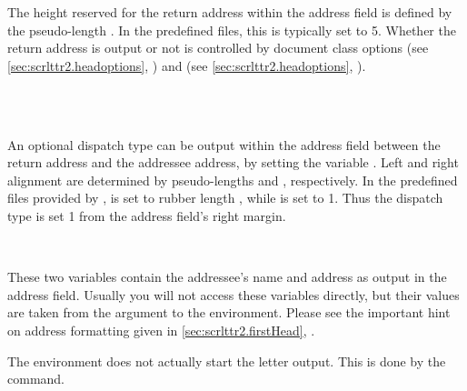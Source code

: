 The height reserved for the return address within the address field is
defined by the pseudo-length . In the
predefined  files, this is typically set to
5. Whether the return address is output or not is controlled
by document class options  (see
\autoref{sec:scrlttr2.headoptions},
) and  (see \autoref{sec:scrlttr2.headoptions},
).
%
%
%


\begin{Declaration}
  \\
  \\
\end{Declaration}
%
%
%
An optional dispatch type can be output within the address field
between the return address and the addressee address, by setting the
variable . Left and right alignment are
determined by pseudo-lengths  and
, respectively. In the predefined
 files provided by \KOMAScript, 
is set to rubber length , while
 is set to 1. Thus the
dispatch type is set 1 from the address field's right margin.
%
%
%
%


\begin{Declaration}
  \\
\end{Declaration}
%
%
These two variables contain the addressee's name and address as output
in the address field. Usually you will not access these variables
directly, but their values are taken from the argument to the
 environment. Please see the
important hint on address formatting given in
\autoref{sec:scrlttr2.firstHead},
.
%
%
%


\begin{Declaration}
\end{Declaration}
%
The  environment does not actually start the
letter output. This is done by the  command.
%
%


